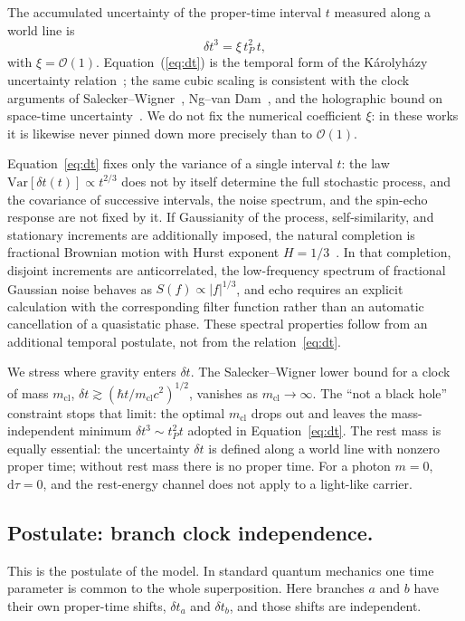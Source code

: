 \documentclass[11pt,a4paper]{article}
\begin{document}
The accumulated uncertainty of the proper-time interval $t$ measured along a world line is
\begin{equation}
\boxed{\delta t^3=\xi\,t_P^2\,t,}
\label{eq:dt}
\end{equation}
with $\xi=\mathcal O(1)$. Equation~(\ref{eq:dt}) is the temporal form of the K\'arolyh\'azy uncertainty relation~\cite{karolyhazy1966}; the same cubic scaling is consistent with the clock arguments of Salecker--Wigner~\cite{saleckerwigner}, Ng--van Dam~\cite{ngvandam1995,ngvandam1994}, and the holographic bound on space-time uncertainty~\cite{ng2005foam}. We do not fix the numerical coefficient $\xi$: in these works it is likewise never pinned down more precisely than to $\mathcal O(1)$.

Equation~\eqref{eq:dt} fixes only the variance of a single interval $t$: the law $\mathrm{Var}[\delta t(t)]\propto t^{2/3}$ does not by itself determine the full stochastic process, and the covariance of successive intervals, the noise spectrum, and the spin-echo response are not fixed by it. If Gaussianity of the process, self-similarity, and stationary increments are additionally imposed, the natural completion is fractional Brownian motion with Hurst exponent $H=1/3$~\cite{mandelbrot1968fbm}. In that completion, disjoint increments are anticorrelated, the low-frequency spectrum of fractional Gaussian noise behaves as $S(f)\propto|f|^{1/3}$, and echo requires an explicit calculation with the corresponding filter function rather than an automatic cancellation of a quasistatic phase. These spectral properties follow from an additional temporal postulate, not from the relation~\eqref{eq:dt}.

We stress where gravity enters $\delta t$. The Salecker--Wigner lower bound for a clock of mass $m_{\mathrm{cl}}$, $\delta t\gtrsim(\hbar t/m_{\mathrm{cl}}c^2)^{1/2}$, vanishes as $m_{\mathrm{cl}}\to\infty$. The ``not a black hole'' constraint stops that limit: the optimal $m_{\mathrm{cl}}$ drops out and leaves the mass-independent minimum $\delta t^3\sim t_P^2 t$ adopted in Equation~\eqref{eq:dt}. The rest mass is equally essential: the uncertainty $\delta t$ is defined along a world line with nonzero proper time; without rest mass there is no proper time. For a photon $m=0$, $\mathrm{d}\tau=0$, and the rest-energy channel does not apply to a light-like carrier.

\subsection{Postulate: branch clock independence.}
\label{sec:postulate}
This is the postulate of the model. In standard quantum mechanics one time parameter is common to the whole superposition. Here branches $a$ and $b$ have their own proper-time shifts, $\delta t_a$ and $\delta t_b$, and those shifts are independent.
\end{document}
